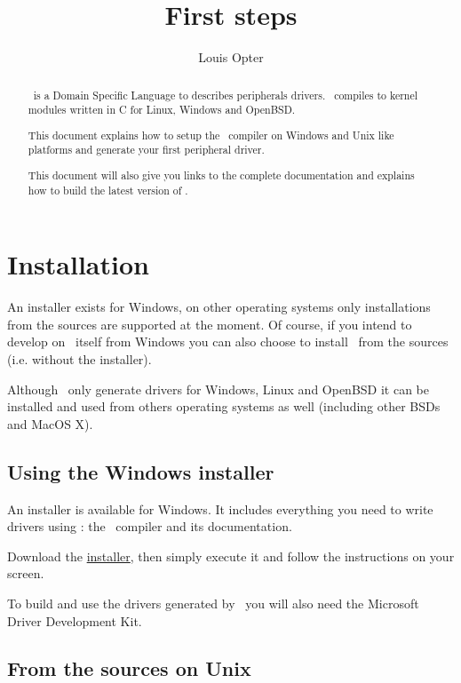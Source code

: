 \documentclass[american]{rtxarticle}
\title{First steps}
\author{Louis Opter}
\begin{document}
\maketitle

\begin{abstract}
\rtx\ is a Domain Specific Language to describes peripherals drivers. \rtx\
compiles to kernel modules written in C for Linux, Windows and OpenBSD.

This document explains how to setup the \rtx\ compiler on Windows and Unix like
platforms and generate your first peripheral driver.

This document will also give you links to the complete documentation and
explains how to build the latest version of \rtx.
\end{abstract}

\tableofcontents

\section{Installation}

An installer exists for Windows, on other operating systems only installations
from the sources are supported at the moment. Of course, if you intend to
develop on \rtx\ itself from Windows you can also choose to install \rtx\ from
the sources (i.e. without the installer).

Although \rtx\ only generate drivers for Windows, Linux and OpenBSD it can be
installed and used from others operating systems as well (including other BSDs
and MacOS X).

\subsection{Using the Windows installer}

An installer is available for Windows. It includes everything you need to write
drivers using \rtx: the \rtx\ compiler and its documentation.

Download the \href{http://rathaxes.googlecode.com/files/rathaxes-latest.exe}{installer},
then simply execute it and follow the instructions on your screen.

To build and use the drivers generated by \rtx\ you will also need the
Microsoft Driver Development Kit.

\subsection{From the sources on Unix}
\end{document}
